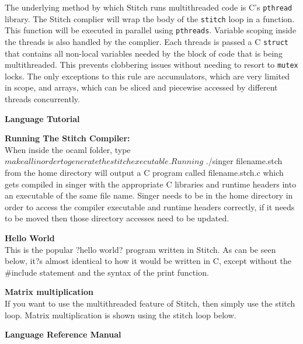 \documentclass[11pt, oneside]{article}   	%
\newcommand{\tab} {\hspace*{2em}}
\begin{document}
The underlying method by which Stitch runs multithreaded code is C's \verb|pthread| library.  The Stitch complier will wrap the body of the \verb|stitch| loop in a function.  This function will be executed in parallel using \verb|pthreads|.  Variable scoping inside the threads is also handled by the complier.  Each threads is passed a C \verb|struct| that contains all non-local variables needed by the block of code that is being multithreaded.  This prevents clobbering issues without needing to resort to \verb|mutex| locks.  The only exceptions to this rule are accumulators, which are very limited in scope, and arrays, which can be sliced and piecewise accessed by different threads concurrently.   

\newpage

\LARGE\textbf{Language Tutorial}\\[2em]
\normalsize

\Large\textbf{Running The Stitch Compiler:}\\[1em]
\normalsize
\tab When inside the ocaml folder, type $ make all in order to generate the stitch executable. Running $ ./singer filename.stch  from the home directory will output a C program called filename.stch.c which gets compiled in singer with the appropriate C libraries and runtime headers into an executable of the same file name. Singer needs to be in the home directory in order to access the compiler executable and runtime headers correctly, if it needs to be moved then those directory accesses need to be updated.

\newpage

\Large\textbf{Hello World}\\[1em]
\normalsize
\tab This is the popular ?hello world? program written in Stitch. As can be seen below, it?s almost identical to how it would be written in C, except without the \#include statement and the syntax of the print function.


\newpage

\Large\textbf{Matrix multiplication}\\[1em]
\normalsize
\tab If you want to use the multithreaded feature of Stitch, then simply use the stitch loop. Matrix multiplication is shown using the stitch loop below.


\newpage

\LARGE\textbf{Language Reference Manual}\\[2em]
\normalsize
\end{document}
